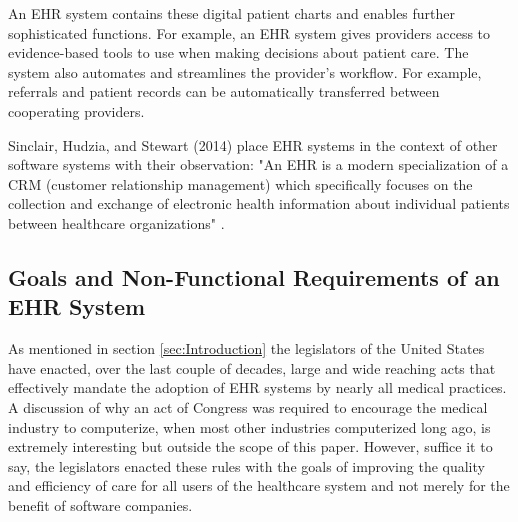 \documentclass[10pt]{article}
\begin{document}
An EHR system contains these digital patient charts and enables further sophisticated functions.
For example, an EHR system gives providers access to evidence-based tools to use when making decisions about patient care.
The system also automates and streamlines the provider's workflow. For example, referrals and patient records can be automatically transferred between cooperating providers.
\cite{healthit-ehr}

Sinclair, Hudzia, and Stewart (2014) place EHR systems in the context of other software systems with their observation: "An EHR is a modern specialization of a CRM (customer relationship management) which specifically focuses on the collection and exchange of electronic health information about individual patients between healthcare organizations" \cite{auditingprivacy}.


\subsection{Goals and Non-Functional Requirements of an EHR System}
\label{sec:Goals of an EHR}

As mentioned in section \ref{sec:Introduction} the legislators of the United States have enacted, over the last couple of decades, large and wide reaching acts that effectively mandate the adoption of EHR systems by nearly all medical practices.
A discussion of why an act of Congress was required to encourage the medical industry to computerize, when most other industries computerized long ago, is extremely interesting but outside the scope of this paper.
However, suffice it to say, the legislators enacted these rules with the goals of improving the quality and efficiency of care for all users of the healthcare system and not merely for the benefit of software companies.
\end{document}
